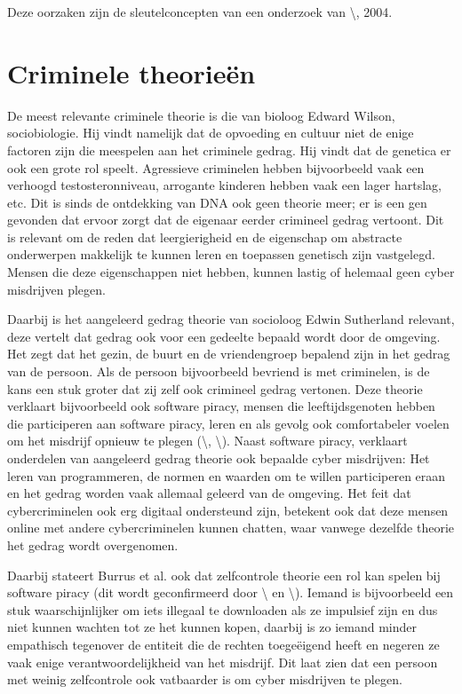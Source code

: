 \documentclass[
]{article}
\begin{document}
Deze oorzaken zijn de sleutelconcepten van een onderzoek van
\textbackslash \cite{Bell2004-pm}, 2004.
\pagebreak
\hypertarget{criminele-theorieuxebn}{%
\section{Criminele theorieën}\label{criminele-theorieuxebn}}

De meest relevante criminele theorie is die van bioloog Edward Wilson,
sociobiologie. Hij vindt namelijk dat de opvoeding en cultuur niet de
enige factoren zijn die meespelen aan het criminele gedrag. Hij vindt
dat de genetica er ook een grote rol speelt. Agressieve criminelen
hebben bijvoorbeeld vaak een verhoogd testosteronniveau, arrogante
kinderen hebben vaak een lager hartslag, etc. Dit is sinds de ontdekking
van DNA ook geen theorie meer; er is een gen gevonden dat ervoor zorgt
dat de eigenaar eerder crimineel gedrag vertoont. Dit is relevant om de
reden dat leergierigheid en de eigenschap om abstracte onderwerpen
makkelijk te kunnen leren en toepassen genetisch zijn vastgelegd. Mensen
die deze eigenschappen niet hebben, kunnen lastig of helemaal geen cyber
misdrijven plegen.

Daarbij is het aangeleerd gedrag theorie van socioloog Edwin Sutherland
relevant, deze vertelt dat gedrag ook voor een gedeelte bepaald wordt
door de omgeving. Het zegt dat het gezin, de buurt en de vriendengroep
bepalend zijn in het gedrag van de persoon. Als de persoon bijvoorbeeld
bevriend is met criminelen, is de kans een stuk groter dat zij zelf ook
crimineel gedrag vertonen. Deze theorie verklaart bijvoorbeeld ook
software piracy, mensen die leeftijdsgenoten hebben die participeren aan
software piracy, leren en als gevolg ook comfortabeler voelen om het
misdrijf opnieuw te plegen (\textbackslash \cite{Burruss2013-uw},
\textbackslash \cite{Hay2020-an}). Naast software piracy, verklaart
onderdelen van aangeleerd gedrag theorie ook bepaalde cyber misdrijven:
Het leren van programmeren, de normen en waarden om te willen
participeren eraan en het gedrag worden vaak allemaal geleerd van de
omgeving. Het feit dat cybercriminelen ook erg digitaal ondersteund
zijn, betekent ook dat deze mensen online met andere cybercriminelen
kunnen chatten, waar vanwege dezelfde theorie het gedrag wordt
overgenomen.

Daarbij stateert Burrus et al. ook dat zelfcontrole theorie een rol kan
spelen bij software piracy (dit wordt geconfirmeerd door
\textbackslash \cite{Rogers2001-jw} en
\textbackslash \cite{Higgins2004-jy}). Iemand is bijvoorbeeld een stuk
waarschijnlijker om iets illegaal te downloaden als ze impulsief zijn en
dus niet kunnen wachten tot ze het kunnen kopen, daarbij is zo iemand
minder empathisch tegenover de entiteit die de rechten toegeëigend heeft
en negeren ze vaak enige verantwoordelijkheid van het misdrijf. Dit laat
zien dat een persoon met weinig zelfcontrole ook vatbaarder is om cyber
misdrijven te plegen.
\end{document}
